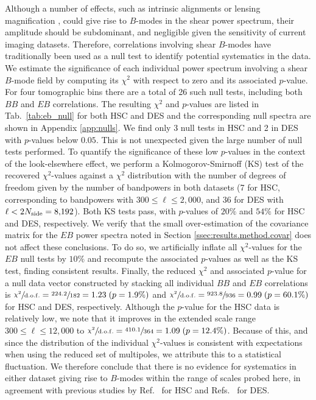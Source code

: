 \documentclass[a4paper,11pt]{article}
\newcommand{\Nside}{N_{\rm side}}
\begin{document}
      Although a number of effects, such as intrinsic alignments or lensing magnification \cite{astro-ph/0202411,0910.3786,0904.4703}, could give rise to $B$-modes in the shear power spectrum, their amplitude should be subdominant, and negligible given the sensitivity of current imaging datasets. Therefore, correlations involving shear $B$-modes have traditionally been used as a null test to identify potential systematics in the data. We estimate the significance of each individual power spectrum involving a shear $B$-mode field by computing its $\chi^2$ with respect to zero and its associated $p$-value. For four tomographic bins there are a total of 26 such null tests, including both $BB$ and $EB$ correlations. The resulting $\chi^2$ and $p$-values are listed in Tab.~\ref{tab:eb_null} for both HSC and DES and the corresponding null spectra are shown in Appendix \ref{app:nulls}. We find only 3 null tests in HSC and 2 in DES with $p$-values below $0.05$. This is not unexpected given the large number of null tests performed. To quantify the significance of these low $p$-values in the context of the look-elsewhere effect, we perform a Kolmogorov-Smirnoff (KS) test of the recovered $\chi^2$-values against a $\chi^2$ distribution with the number of degrees of freedom given by the number of bandpowers in both datasets (7 for HSC, corresponding to bandpowers with $300 \leq \ell \leq 2{,}000$, and 36 for DES with $\ell < 2\Nside = 8{,}192$). Both KS tests pass, with $p$-values of $20\%$ and $54\%$ for HSC and DES, respectively. We verify that the small over-estimation of the covariance matrix for the $EB$ power spectra noted in Section \ref{ssec:results.method.covar} does not affect these conclusions. To do so, we artificially inflate all $\chi^2$-values for the $EB$ null tests by $10\%$ and recompute the associated $p$-values as well as the KS test, finding consistent results. Finally, the reduced $\chi^2$ and associated $p$-value for a null data vector constructed by stacking all individual $BB$ and $EB$ correlations is $\sfrac{\chi^2}{{\rm d.o.f.}}=\sfrac{224.2}{182}=1.23\;(p=1.9\%)$ and $\sfrac{\chi^2}{{\rm d.o.f.}}=\sfrac{923.8}{936}=0.99\;(p=60.1\%)$ for HSC and DES, respectively. Although the $p$-value for the HSC data is relatively low, we note that it improves in the extended scale range $300 \leq \ell \leq 12,000$ to $\sfrac{\chi^2}{{\rm d.o.f.}}=\sfrac{410.1}{364}=1.09\;(p=12.4\%)$. Because of this, and since the distribution of the individual $\chi^{2}$-values is consistent with expectations when using the reduced set of multipoles, we attribute this to a statistical fluctuation. We therefore conclude that there is no evidence for systematics in either dataset giving rise to $B$-modes within the range of scales probed here, in agreement with previous studies by Ref.~\cite{1809.09148} for HSC and Refs.~\cite{1708.01533,1811.10596} for DES.
\end{document}
